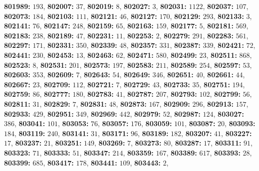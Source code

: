 \textsf{\bfseries 801989:} $193$, \textsf{\bfseries 802007:} $37$, \textsf{\bfseries 802019:} $8$, \textsf{\bfseries 802027:} $3$, \textsf{\bfseries 802031:} $1122$, \textsf{\bfseries 802037:} $107$, \textsf{\bfseries 802073:} $184$, \textsf{\bfseries 802103:} $111$, \textsf{\bfseries 802121:} $46$, \textsf{\bfseries 802127:} $170$, \textsf{\bfseries 802129:} $293$, \textsf{\bfseries 802133:} $3$, \textsf{\bfseries 802141:} $76$, \textsf{\bfseries 802147:} $248$, \textsf{\bfseries 802159:} $65$, \textsf{\bfseries 802163:} $159$, \textsf{\bfseries 802177:} $5$, \textsf{\bfseries 802181:} $569$, \textsf{\bfseries 802183:} $238$, \textsf{\bfseries 802189:} $47$, \textsf{\bfseries 802231:} $11$, \textsf{\bfseries 802253:} $2$, \textsf{\bfseries 802279:} $291$, \textsf{\bfseries 802283:} $561$, \textsf{\bfseries 802297:} $171$, \textsf{\bfseries 802331:} $350$, \textsf{\bfseries 802339:} $48$, \textsf{\bfseries 802357:} $331$, \textsf{\bfseries 802387:} $339$, \textsf{\bfseries 802421:} $72$, \textsf{\bfseries 802441:} $230$, \textsf{\bfseries 802453:} $13$, \textsf{\bfseries 802463:} $62$, \textsf{\bfseries 802471:} $580$, \textsf{\bfseries 802499:} $23$, \textsf{\bfseries 802511:} $868$, \textsf{\bfseries 802523:} $8$, \textsf{\bfseries 802531:} $201$, \textsf{\bfseries 802573:} $197$, \textsf{\bfseries 802583:} $211$, \textsf{\bfseries 802589:} $254$, \textsf{\bfseries 802597:} $53$, \textsf{\bfseries 802603:} $353$, \textsf{\bfseries 802609:} $7$, \textsf{\bfseries 802643:} $54$, \textsf{\bfseries 802649:} $346$, \textsf{\bfseries 802651:} $40$, \textsf{\bfseries 802661:} $44$, \textsf{\bfseries 802667:} $23$, \textsf{\bfseries 802709:} $112$, \textsf{\bfseries 802721:} $7$, \textsf{\bfseries 802729:} $43$, \textsf{\bfseries 802733:} $35$, \textsf{\bfseries 802751:} $194$, \textsf{\bfseries 802759:} $86$, \textsf{\bfseries 802777:} $180$, \textsf{\bfseries 802783:} $41$, \textsf{\bfseries 802787:} $207$, \textsf{\bfseries 802793:} $102$, \textsf{\bfseries 802799:} $56$, \textsf{\bfseries 802811:} $31$, \textsf{\bfseries 802829:} $7$, \textsf{\bfseries 802831:} $48$, \textsf{\bfseries 802873:} $167$, \textsf{\bfseries 802909:} $296$, \textsf{\bfseries 802913:} $157$, \textsf{\bfseries 802933:} $429$, \textsf{\bfseries 802951:} $349$, \textsf{\bfseries 802969:} $442$, \textsf{\bfseries 802979:} $52$, \textsf{\bfseries 802987:} $124$, \textsf{\bfseries 803027:} $386$, \textsf{\bfseries 803041:} $101$, \textsf{\bfseries 803053:} $76$, \textsf{\bfseries 803057:} $176$, \textsf{\bfseries 803059:} $101$, \textsf{\bfseries 803087:} $20$, \textsf{\bfseries 803093:} $184$, \textsf{\bfseries 803119:} $240$, \textsf{\bfseries 803141:} $31$, \textsf{\bfseries 803171:} $96$, \textsf{\bfseries 803189:} $182$, \textsf{\bfseries 803207:} $41$, \textsf{\bfseries 803227:} $17$, \textsf{\bfseries 803237:} $21$, \textsf{\bfseries 803251:} $149$, \textsf{\bfseries 803269:} $7$, \textsf{\bfseries 803273:} $80$, \textsf{\bfseries 803287:} $17$, \textsf{\bfseries 803311:} $91$, \textsf{\bfseries 803323:} $71$, \textsf{\bfseries 803333:} $51$, \textsf{\bfseries 803347:} $214$, \textsf{\bfseries 803359:} $167$, \textsf{\bfseries 803389:} $617$, \textsf{\bfseries 803393:} $28$, \textsf{\bfseries 803399:} $685$, \textsf{\bfseries 803417:} $178$, \textsf{\bfseries 803441:} $109$, \textsf{\bfseries 803443:} $2$, 
